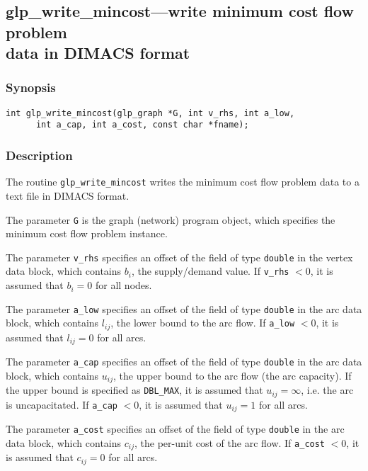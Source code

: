 \newpage

\subsection{glp\_write\_mincost---write minimum cost flow problem\\data
in DIMACS format}

\subsubsection*{Synopsis}

\begin{verbatim}
int glp_write_mincost(glp_graph *G, int v_rhs, int a_low,
      int a_cap, int a_cost, const char *fname);
\end{verbatim}

\subsubsection*{Description}

The routine \verb|glp_write_mincost| writes the minimum cost flow
problem data to a text file in DIMACS format.

The parameter \verb|G| is the graph (network) program object, which
specifies the minimum cost flow problem instance.

The parameter \verb|v_rhs| specifies an offset of the field of type
\verb|double| in the vertex data block, which contains $b_i$, the
supply/demand value. If \verb|v_rhs| $<0$, it is assumed that $b_i=0$
for all nodes.

The parameter \verb|a_low| specifies an offset of the field of type
\verb|double| in the arc data block, which contains $l_{ij}$, the lower
bound to the arc flow. If \verb|a_low| $<0$, it is assumed that
$l_{ij}=0$ for all arcs.

The parameter \verb|a_cap| specifies an offset of the field of type
\verb|double| in the arc data block, which contains $u_{ij}$, the upper
bound to the arc flow (the arc capacity). If the upper bound is
specified as \verb|DBL_MAX|, it is assumed that $u_{ij}=\infty$, i.e.
the arc is uncapacitated. If \verb|a_cap| $<0$, it is assumed that
$u_{ij}=1$ for all arcs.

The parameter \verb|a_cost| specifies an offset of the field of type
\verb|double| in the arc data block, which contains $c_{ij}$, the
per-unit cost of the arc flow. If \verb|a_cost| $<0$, it is assumed that
$c_{ij}=0$ for all arcs.

